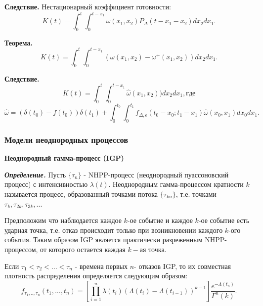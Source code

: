 {\bfseries Следствие.} Нестационарный коэффициент готовности:
\begin{equation}
K(t) = \int_0^t \int_0^{t - x_1} \omega(x_1, x_2) P_\Delta(t - x_1 - x_2) d x_2 d x_1.
\end{equation}

{\bfseries Теорема.}
\begin{equation}
K(t) = \int_0^t \int_0^{t - x_1}( \omega(x_1, x_2) -  \omega^+(x_1, x_2)) d x_2 d x_1.
\end{equation}

{\bfseries Следствие.}
\begin{equation}
K(t) = \int_0^t \int_0^{t - x_1}\widehat{\omega}(x_1, x_2)) d x_2 d x_1, где
\end{equation}
\begin{equation}
\widehat{\omega} = (\delta(t_0) - f(t_0))\delta(t_1) + \int_0^{t_0} \int_0^{t_1} f_{\Delta, \epsilon}(t_0 - x_0; t_1 - x_1)\widehat{\omega}(x_0, x_1) d x_0 d x_1.
\end{equation}

\begin{center}
\item\subsubsection{Модели неоднородных процессов}\hspace{4pt}
\end{center}

{\bfseries Неоднородный гамма-процесс (IGP)}

{\bfseries \textit{Определение.}} Пусть $\{\tau_n\}$ - NHPP-процесс (неоднородный пуассоновский процесс) с интенсивностью $\lambda(t)$. Неоднородным гамма-процессом кратности $k$ называется процесс, образованный точками потока $\{\tau_{kn}\}$, т.е. точками $\tau_{k}, \tau_{2k}, \tau_{3k}, ...$

Предположим что наблюдается каждое $k$-ое событие и каждое $k$-ое событие есть ударная точка, т.е. отказ происходит только при возникновении каждого $k$-ого события. Таким образом IGP является практически разреженным NHPP-процессом, от которого остается каждая $k-ая$ точка.

Если $\tau_1 < \tau_2 < ... < \tau_n$ - времена первых $n $- отказов  IGP, то их совместная плотность распределения определяется следующим образом:
\begin{equation}
f_{\tau_1,..,\tau_n}(t_1, ..., t_n) = [\prod_{i=1}^n \lambda(t_i) (\Lambda(t_i) - \Lambda(t_{i-1}))^{k-1}] \frac{e^{-\Lambda(t_n)}}{\Gamma^n(k)}.
\end{equation}

